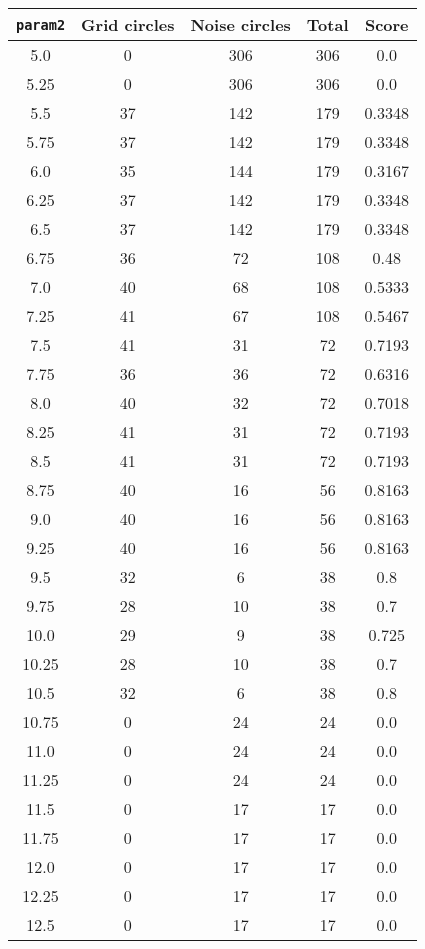 \documentclass[letterpaper, 12pt]{article}
\begin{document}
\begin{longtable}{|c|c|c|c|c|}
\hline
\textbf{\texttt{param2}} & \textbf{Grid circles} & \textbf{Noise circles} & \textbf{Total} & \textbf{Score} \\
\hline
5.0 & 0 & 306 & 306 & 0.0 \\
\hline
5.25 & 0 & 306 & 306 & 0.0 \\
\hline
5.5 & 37 & 142 & 179 & 0.3348 \\
\hline
5.75 & 37 & 142 & 179 & 0.3348 \\
\hline
6.0 & 35 & 144 & 179 & 0.3167 \\
\hline
6.25 & 37 & 142 & 179 & 0.3348 \\
\hline
6.5 & 37 & 142 & 179 & 0.3348 \\
\hline
6.75 & 36 & 72 & 108 & 0.48 \\
\hline
7.0 & 40 & 68 & 108 & 0.5333 \\
\hline
7.25 & 41 & 67 & 108 & 0.5467 \\
\hline
7.5 & 41 & 31 & 72 & 0.7193 \\
\hline
7.75 & 36 & 36 & 72 & 0.6316 \\
\hline
8.0 & 40 & 32 & 72 & 0.7018 \\
\hline
8.25 & 41 & 31 & 72 & 0.7193 \\
\hline
8.5 & 41 & 31 & 72 & 0.7193 \\
\hline
8.75 & 40 & 16 & 56 & 0.8163 \\
\hline
9.0 & 40 & 16 & 56 & 0.8163 \\
\hline
9.25 & 40 & 16 & 56 & 0.8163 \\
\hline
9.5 & 32 & 6 & 38 & 0.8 \\
\hline
9.75 & 28 & 10 & 38 & 0.7 \\
\hline
10.0 & 29 & 9 & 38 & 0.725 \\
\hline
10.25 & 28 & 10 & 38 & 0.7 \\
\hline
10.5 & 32 & 6 & 38 & 0.8 \\
\hline
10.75 & 0 & 24 & 24 & 0.0 \\
\hline
11.0 & 0 & 24 & 24 & 0.0 \\
\hline
11.25 & 0 & 24 & 24 & 0.0 \\
\hline
11.5 & 0 & 17 & 17 & 0.0 \\
\hline
11.75 & 0 & 17 & 17 & 0.0 \\
\hline
12.0 & 0 & 17 & 17 & 0.0 \\
\hline
12.25 & 0 & 17 & 17 & 0.0 \\
\hline
12.5 & 0 & 17 & 17 & 0.0 \\

\end{longtable}
\end{document}

